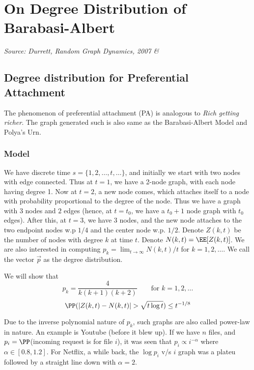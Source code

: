 \chapter{On Degree Distribution of Barabasi-Albert}
\textit{Source: Durrett, Random Graph Dynamics, 2007 \& }
\section{Degree distribution for Preferential Attachment}
The phenomenon of preferential attachment (PA) is analogous to \textit{Rich getting richer}. The graph generated such is also same as the Barabasi-Albert Model and Polya's Urn.
\subsection{Model}
We have discrete time $s = \{1,2,\dots, t,\dots\}$, and initially we start with two nodes with edge connected. Thus at $t=1$, we have a 2-node graph, with each node having degree 1. Now at $t = 2$, a new node comes, which attaches itself to a node with probability proportional to the degree of the node. Thus we have a graph with $3$ nodes and $2$ edges (hence, at $t=t_0$, we have a $t_0+1$ node graph with $t_0$ edges). After this, at $t=3$, we have $3$ nodes, and the new node attaches to the two endpoint nodes w.p $1/4$ and the center node w.p. $1/2$. Denote $Z(k,t)$ be the number of nodes with degree $k$ at time $t$. Denote $N(k,t) = \EE[Z(k,t)]$. We are also interested in computing $p_k = \lim_{t\to\infty} {N(k,t)}/t$ for $k=1,2,\dots$. We call the vector $\overrightarrow{p}$ as the degree distribution.
\begin{prop}
We will show that
\begin{equation}
    p_k = \frac{4}{k(k+1)(k+2)} \qquad \text{for } k =1,2,\dots
\end{equation}
\begin{equation}
    \PP(|Z(k,t) - N(k,t)| > \sqrt{t\log t}) \leq t^{-1/8}
\end{equation}
\end{prop}
\begin{remark}
Due to the inverse polynomial nature of $p_k$, such graphs are also called power-law in nature. An example is Youtube (before it blew up). If we have $n$ files, and $p_i = \PP$(incoming request is for file $i$), it was seen that $p_i \propto i^{-\alpha}$ where $\alpha \in [0.8, 1.2]$. For Netflix, a while back, the $\log p_i$ v/s $i$ graph was a plateu followed by a straight line down with $\alpha = 2$.
\end{remark}
